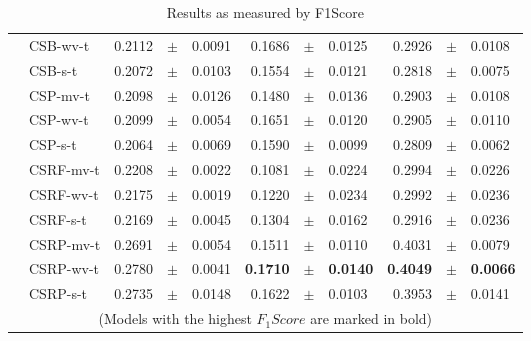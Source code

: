 {\begin{table}[!t]
\begin{tabular}{l l r@{\hskip 0in}c@{\hskip 0in}l r@{\hskip 0in}c@{\hskip 0in}l r@{\hskip 
0in}c@{\hskip 0in}l}
&CSB-wv-t & 0.2112 &$\pm$& 0.0091 & 0.1686 &$\pm$& 0.0125 & 0.2926 &$\pm$& 0.0108 \\
&CSB-s-t & 0.2072 &$\pm$& 0.0103 & 0.1554 &$\pm$& 0.0121 & 0.2818 &$\pm$& 0.0075 \\
&CSP-mv-t & 0.2098 &$\pm$& 0.0126 & 0.1480 &$\pm$& 0.0136 & 0.2903 &$\pm$& 0.0108 \\
&CSP-wv-t & 0.2099 &$\pm$& 0.0054 & 0.1651 &$\pm$& 0.0120 & 0.2905 &$\pm$& 0.0110 \\
&CSP-s-t & 0.2064 &$\pm$& 0.0069 & 0.1590 &$\pm$& 0.0099 & 0.2809 &$\pm$& 0.0062 \\
&CSRF-mv-t & 0.2208 &$\pm$& 0.0022 & 0.1081 &$\pm$& 0.0224 & 0.2994 &$\pm$& 0.0226 \\
&CSRF-wv-t & 0.2175 &$\pm$& 0.0019 & 0.1220 &$\pm$& 0.0234 & 0.2992 &$\pm$& 0.0236 \\
&CSRF-s-t & 0.2169 &$\pm$& 0.0045 & 0.1304 &$\pm$& 0.0162 & 0.2916 &$\pm$& 0.0236 \\
&CSRP-mv-t & 0.2691 &$\pm$& 0.0054 & 0.1511 &$\pm$& 0.0110 & 0.4031 &$\pm$& 0.0079 \\
&CSRP-wv-t & 0.2780 &$\pm$& 0.0041 & \bf{0.1710} &\bf{$\pm$}& \bf{0.0140} & \bf{0.4049} 
&\bf{$\pm$}& \bf{0.0066}\\
&CSRP-s-t & 0.2735 &$\pm$& 0.0148 & 0.1622 &$\pm$& 0.0103 & 0.3953 &$\pm$& 0.0141 \\
      \hline
      \multicolumn{11}{c}{(Models with the highest $F_1Score$ are marked in bold)}
    \end{tabular}
\caption{Results as measured by F1Score}
\label{tab:9:results_f1score}
  \end{table}

}
